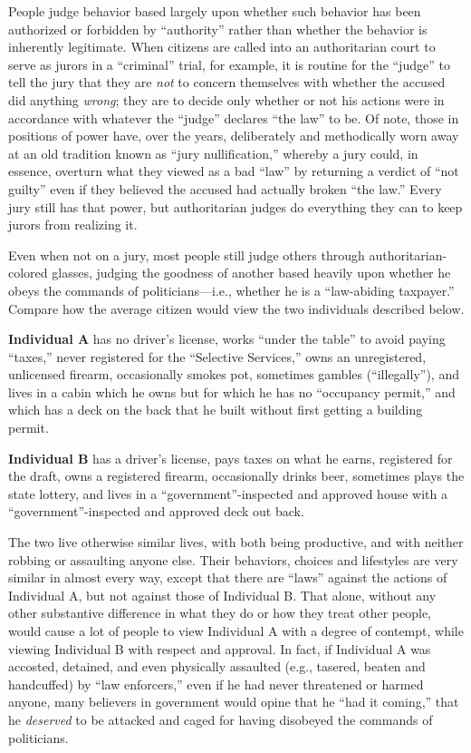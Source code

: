 \documentclass{book}
\begin{document}
People judge behavior based largely upon whether such behavior has been authorized or forbidden by \enquote{authority} rather than whether the behavior is inherently legitimate. When citizens are called into an authoritarian court to serve as jurors in a \enquote{criminal} trial, for example, it is routine for the \enquote{judge} to tell the jury that they are \emph{not} to concern themselves with whether the accused did anything \emph{wrong}; they are to decide only whether or not his actions were in accordance with whatever the \enquote{judge} declares \enquote{the law} to be. Of note, those in positions of power have, over the years, deliberately and methodically worn away at an old tradition known as \enquote{jury nullification,} whereby a jury could, in essence, overturn what they viewed as a bad \enquote{law} by returning a verdict of \enquote{not guilty} even if they believed the accused had actually broken \enquote{the law.} Every jury still has that power, but authoritarian judges do everything they can to keep jurors from realizing it.

Even when not on a jury, most people still judge others through authoritarian-colored glasses, judging the goodness of another based heavily upon whether he obeys the commands of politicians---i.e., whether he is a \enquote{law-abiding taxpayer.} Compare how the average citizen would view the two individuals described below.

\textbf{Individual A} has no driver's license, works \enquote{under the table} to avoid paying \enquote{taxes,} never registered for the \enquote{Selective Services,} owns an unregistered, unlicensed firearm, occasionally smokes pot, sometimes gambles (\enquote{illegally}), and lives in a cabin which he owns but for which he has no \enquote{occupancy permit,} and which has a deck on the back that he built without first getting a building permit.

\textbf{Individual B} has a driver's license, pays taxes on what he earns, registered for the draft, owns a registered firearm, occasionally drinks beer, sometimes plays the state lottery, and lives in a \enquote{government}-inspected and approved house with a \enquote{government}-inspected and approved deck out back.

The two live otherwise similar lives, with both being productive, and with neither robbing or assaulting anyone else. Their behaviors, choices and lifestyles are very similar in almost every way, except that there are \enquote{laws} against the actions of Individual A, but not against those of Individual B. That alone, without any other substantive difference in what they do or how they treat other people, would cause a lot of people to view Individual A with a degree of contempt, while viewing Individual B with respect and approval. In fact, if Individual A was accosted, detained, and even physically assaulted (e.g., tasered, beaten and handcuffed) by \enquote{law enforcers,} even if he had never threatened or harmed anyone, many believers in government would opine that he \enquote{had it coming,} that he \emph{deserved} to be attacked and caged for having disobeyed the commands of politicians.
\end{document}
